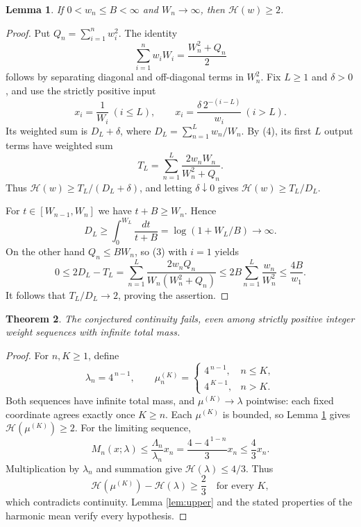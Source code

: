 \documentclass[11pt]{article}
\newtheorem{theorem}{Theorem}
\newtheorem{lemma}[theorem]{Lemma}
\newcommand{\HM}{\mathscr H}
\begin{document}
\begin{lemma}\label{lem:lower}
If \(0<w_n\le B<\infty\) and \(W_n\to\infty\), then \(\HM(w)\ge2\).
\end{lemma}
\begin{proof}
Put \(Q_n=\sum_{i=1}^n w_i^2\). The identity
\[
 \sum_{i=1}^n w_iW_i=\frac{W_n^2+Q_n}{2}
 \tag{4}
\]
follows by separating diagonal and off-diagonal terms in \(W_n^2\).
Fix \(L\ge1\) and \(\delta>0\), and use the strictly positive input
\[
 x_i=\frac1{W_i}\ (i\le L),\qquad
 x_i=\frac{\delta\,2^{-(i-L)}}{w_i}\ (i>L).
\]
Its weighted sum is \(D_L+\delta\), where \(D_L=\sum_{n=1}^Lw_n/W_n\).
By (4), its first \(L\) output terms have weighted sum
\[
 T_L=\sum_{n=1}^L\frac{2w_nW_n}{W_n^2+Q_n}.
\]
Thus \(\HM(w)\ge T_L/(D_L+\delta)\), and letting \(\delta\downarrow0\)
gives \(\HM(w)\ge T_L/D_L\).

For \(t\in[W_{n-1},W_n]\) we have \(t+B\ge W_n\). Hence
\[
 D_L\ge\int_0^{W_L}\frac{dt}{t+B}
      =\log(1+W_L/B)\longrightarrow\infty.
\]
On the other hand \(Q_n\le BW_n\), so (3) with \(i=1\) yields
\[
 0\le2D_L-T_L
 =\sum_{n=1}^L\frac{2w_nQ_n}{W_n(W_n^2+Q_n)}
 \le2B\sum_{n=1}^L\frac{w_n}{W_n^2}
 \le\frac{4B}{w_1}.
\]
It follows that \(T_L/D_L\to2\), proving the assertion.
\end{proof}

\begin{theorem}
The conjectured continuity fails, even among strictly positive
integer weight sequences with infinite total mass.
\end{theorem}
\begin{proof}
For \(n,K\ge1\), define
\[
 \lambda_n=4^{\,n-1},\qquad
 \mu_n^{(K)}=
 \begin{cases}
 4^{\,n-1},&n\le K,\\
 4^{\,K-1},&n>K.
 \end{cases}
\]
Both sequences have infinite total mass, and
\(\mu^{(K)}\to\lambda\) pointwise: each fixed coordinate agrees
exactly once \(K\ge n\). Each \(\mu^{(K)}\) is bounded, so
Lemma \ref{lem:lower} gives \(\HM(\mu^{(K)})\ge2\).
For the limiting sequence,
\[
 M_n(x;\lambda)
 \le\frac{\Lambda_n}{\lambda_n}x_n
 =\frac{4-4^{\,1-n}}3x_n\le\frac43x_n.
\]
Multiplication by \(\lambda_n\) and summation give
\(\HM(\lambda)\le4/3\). Thus
\[
 \HM(\mu^{(K)})-\HM(\lambda)\ge\frac23
 \quad\text{for every }K,
\]
which contradicts continuity. Lemma \ref{lem:upper} and the stated
properties of the harmonic mean verify every hypothesis.
\end{proof}
\end{document}
